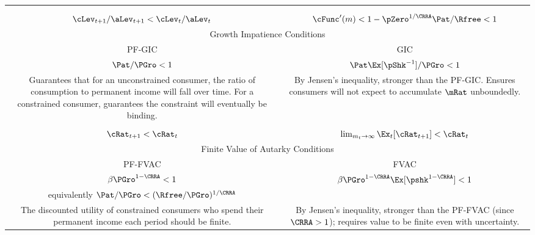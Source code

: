 \begin{table}[!th]
\begin{tabular}{|c|c|}
& \\
& \\
$\cLev_{t+1}/\aLev_{t+1} < \cLev_{t}/\aLev_{t}$              & $\cFunc^{\prime}(m) < 1-\pZero^{1/\CRRA}\Pat/\Rfree < 1$
\\ \hline
\multicolumn{2}{|c|}{Growth Impatience Conditions} \\ \hline
\multicolumn{1}{|c|}{PF-GIC} & \multicolumn{1}{c|}{GIC} \\ \hline
$\Pat/\PGro < 1$                                         & $\Pat\Ex[\pShk^{-1}]/\PGro < 1 $ \\
\multirow{4}{75mm}{Guarantees that for an unconstrained consumer, the ratio of consumption to permanent income will fall over time.  For a constrained consumer, guarantees the constraint will eventually be binding.} & 
\multirow{4}{75mm}{By Jensen's inequality, stronger than the PF-GIC.  Ensures consumers will not expect to accumulate $\mRat$ unboundedly.} \\ 
& \\
& \\
& \\
& \\
$\cRat_{t+1} < \cRat_{t} $ & $\lim_{m_{t} \rightarrow \infty} \Ex_{t} [\cRat_{t+1}] < \cRat_{t}$ \\ \hline
\multicolumn{2}{|c|}{Finite Value of Autarky Conditions} \\ \hline
\multicolumn{1}{|c|}{PF-FVAC} & \multicolumn{1}{c|}{FVAC} \\ \hline
$\beta \PGro^{1-\CRRA} < 1$                                                 & $\beta \PGro^{1-\CRRA}\Ex[\pshk^{1-\CRRA}] < 1$  \\
equivalently $\Pat/\PGro  < (\Rfree/\PGro)^{1/\CRRA}$ & \\
\multirow{3}{75mm}{The discounted utility of constrained consumers who spend their permanent income each period should be finite.} &
\multirow{3}{75mm}{By Jensen's inequality, stronger than the PF-FVAC (since $\CRRA>1$); requires value to be finite even with uncertainty.}  \\
& \\
& \\ \hline
\end{tabular}
\end{table}
\clearpage
